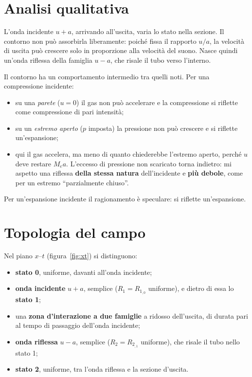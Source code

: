 \documentclass[11pt,a4paper]{article}
\newcommand{\uma}{u-a}
\newcommand{\upa}{u+a}
\newcommand{\Ru}{R_1}
\newcommand{\Rd}{R_2}
\newcommand{\Me}{M_e}
\begin{document}
\section{Analisi qualitativa}
L'onda incidente $\upa$, arrivando all'uscita, varia lo stato nella sezione. Il contorno non può assorbirla
liberamente: poiché fissa il rapporto $u/a$, la velocità di uscita può crescere solo in proporzione alla velocità
del suono. Nasce quindi un'onda riflessa della famiglia $\uma$, che risale il tubo verso l'interno.

Il contorno ha un comportamento intermedio tra quelli noti. Per una compressione incidente:
\begin{itemize}
  \item su una \emph{parete} ($u=0$) il gas non può accelerare e la compressione si riflette come compressione di
    pari intensità;
  \item su un \emph{estremo aperto} ($p$ imposta) la pressione non può crescere e si riflette un'espansione;
  \item qui il gas accelera, ma meno di quanto chiederebbe l'estremo aperto, perché $u$ deve restare $\Me a$.
    L'eccesso di pressione non scaricato torna indietro: mi aspetto una riflessa \textbf{della stessa natura}
    dell'incidente e \textbf{più debole}, come per un estremo ``parzialmente chiuso''.
\end{itemize}
Per un'espansione incidente il ragionamento è speculare: si riflette un'espansione.

\section{Topologia del campo}
Nel piano $x$--$t$ (figura~\ref{fig:xt}) si distinguono:
\begin{itemize}
  \item \textbf{stato 0}, uniforme, davanti all'onda incidente;
  \item \textbf{onda incidente} $\upa$, semplice ($\Ru=\Ru_{,0}$ uniforme), e dietro di essa lo \textbf{stato 1};
  \item una \textbf{zona d'interazione a due famiglie} a ridosso dell'uscita, di durata pari al tempo di
    passaggio dell'onda incidente;
  \item \textbf{onda riflessa} $\uma$, semplice ($\Rd=\Rd_{,1}$ uniforme), che risale il tubo nello stato 1;
  \item \textbf{stato 2}, uniforme, tra l'onda riflessa e la sezione d'uscita.
\end{itemize}
\end{document}
